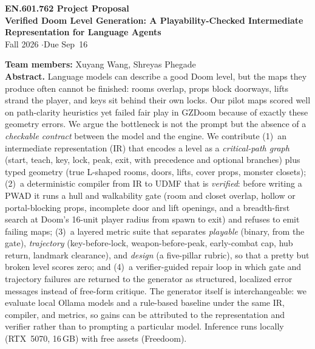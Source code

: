 \documentclass[11pt]{article}
\begin{document}
\begin{center}
{\large\bfseries EN.601.762 Project Proposal}\\[0.35em]
{\bfseries Verified Doom Level Generation: A Playability-Checked Intermediate Representation for Language Agents}\\[0.25em]
{\small Fall 2026 \quad$\cdot$\quad Due Sep~16}
\end{center}

\noindent\textbf{Team members:} Xuyang Wang, Shreyas Phegade\\

\vspace{0.4em}
\noindent\textbf{Abstract.}
Language models can describe a good Doom level, but the maps they produce often cannot be finished: rooms overlap, props block doorways, lifts strand the player, and keys sit behind their own locks.
Our pilot maps scored well on path-clarity heuristics yet failed fair play in GZDoom because of exactly these geometry errors.
We argue the bottleneck is not the prompt but the absence of a \emph{checkable contract} between the model and the engine.
We contribute (1)~an intermediate representation (IR) that encodes a level as a \emph{critical-path graph} (start, teach, key, lock, peak, exit, with precedence and optional branches) plus typed geometry (true L-shaped rooms, doors, lifts, cover props, monster closets);
(2)~a deterministic compiler from IR to UDMF that is \emph{verified}: before writing a PWAD it runs a hull and walkability gate (room and closet overlap, hollow or portal-blocking props, incomplete door and lift openings, and a breadth-first search at Doom's 16-unit player radius from spawn to exit) and refuses to emit failing maps;
(3)~a layered metric suite that separates \emph{playable} (binary, from the gate), \emph{trajectory} (key-before-lock, weapon-before-peak, early-combat cap, hub return, landmark clearance), and \emph{design} (a five-pillar rubric), so that a pretty but broken level scores zero;
and (4)~a verifier-guided repair loop in which gate and trajectory failures are returned to the generator as structured, localized error messages instead of free-form critique.
The generator itself is interchangeable: we evaluate local Ollama models and a rule-based baseline under the same IR, compiler, and metrics, so gains can be attributed to the representation and verifier rather than to prompting a particular model.
Inference runs locally (RTX~5070, 16\,GB) with free assets (Freedoom).
\end{document}
